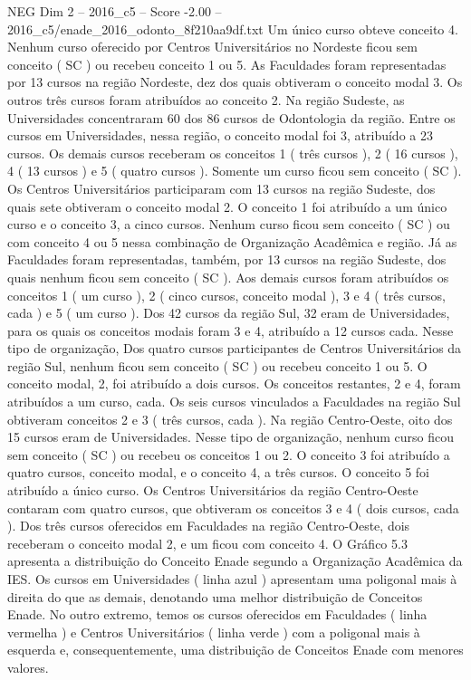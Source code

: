 \begin{textsample}{NEG Dim 2 – 2016\_c5 – Score -2.00 – 2016\_c5/enade\_2016\_odonto\_8f210aa9df.txt}
Um único curso obteve conceito 4.
Nenhum curso oferecido por Centros Universitários no Nordeste ficou sem conceito ( SC ) ou recebeu conceito 1 ou 5.
As Faculdades foram representadas por 13 cursos na região Nordeste, dez dos quais obtiveram o conceito modal 3.
Os outros três cursos foram atribuídos ao conceito 2.
Na região Sudeste, as Universidades concentraram 60 dos 86 cursos de Odontologia da região.
Entre os cursos em Universidades, nessa região, o conceito modal foi 3, atribuído a 23 cursos.
Os demais cursos receberam os conceitos 1 ( três cursos ), 2 ( 16 cursos ), 4 ( 13 cursos ) e 5 ( quatro cursos ).
Somente um curso ficou sem conceito ( SC ).
Os Centros Universitários participaram com 13 cursos na região Sudeste, dos quais sete obtiveram o conceito modal 2.
O conceito 1 foi atribuído a um único curso e o conceito 3, a cinco cursos.
Nenhum curso ficou sem conceito ( SC ) ou com conceito 4 ou 5 nessa combinação de Organização Acadêmica e região.
Já as Faculdades foram representadas, também, por 13 cursos na região Sudeste, dos quais nenhum ficou sem conceito ( SC ).
Aos demais cursos foram atribuídos os conceitos 1 ( um curso ), 2 ( cinco cursos, conceito modal ), 3 e 4 ( três cursos, cada ) e 5 ( um curso ).
Dos 42 cursos da região Sul, 32 eram de Universidades, para os quais os conceitos modais foram 3 e 4, atribuído a 12 cursos cada.
Nesse tipo de organização, Dos quatro cursos participantes de Centros Universitários da região Sul, nenhum ficou sem conceito ( SC ) ou recebeu conceito 1 ou 5.
O conceito modal, 2, foi atribuído a dois cursos.
Os conceitos restantes, 2 e 4, foram atribuídos a um curso, cada.
Os seis cursos vinculados a Faculdades na região Sul obtiveram conceitos 2 e 3 ( três cursos, cada ).
Na região Centro-Oeste, oito dos 15 cursos eram de Universidades.
Nesse tipo de organização, nenhum curso ficou sem conceito ( SC ) ou recebeu os conceitos 1 ou 2.
O conceito 3 foi atribuído a quatro cursos, conceito modal, e o conceito 4, a três cursos.
O conceito 5 foi atribuído a único curso.
Os Centros Universitários da região Centro-Oeste contaram com quatro cursos, que obtiveram os conceitos 3 e 4 ( dois cursos, cada ).
Dos três cursos oferecidos em Faculdades na região Centro-Oeste, dois receberam o conceito modal 2, e um ficou com conceito 4.
O Gráfico 5.3 apresenta a distribuição do Conceito Enade segundo a Organização Acadêmica da IES.
Os cursos em Universidades ( linha azul ) apresentam uma poligonal mais à direita do que as demais, denotando uma melhor distribuição de Conceitos Enade.
No outro extremo, temos os cursos oferecidos em Faculdades ( linha vermelha ) e Centros Universitários ( linha verde ) com a poligonal mais à esquerda e, consequentemente, uma distribuição de Conceitos Enade com menores valores.

\end{textsample}
